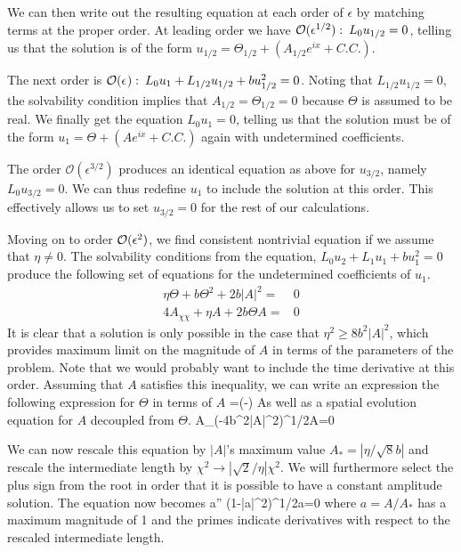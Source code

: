 \documentclass[../main/WavelengthCompetition.tex]{subfiles}
\begin{document}
We can then write out the resulting equation at each order of $\epsilon$ by matching terms at the proper order.
At leading order we have $\mathcal{O}(\epsilon^{1/2}): \: L_0 u_{1/2} =0$, telling us that the solution is of the form $u_{1/2} =\Theta_{1/2} + (A_{1/2} e^{ix} +C.C.)$.

The next order is $\mathcal{O}(\epsilon^{}): \:  L_0 u_{1}+L_{1/2} u_{1/2}  +b u_{1/2}^2=0$.  Noting that $L_{1/2} u_{1/2} =0$, the solvability condition implies that $A_{1/2}=\Theta_{1/2}=0$ because $\Theta$ is assumed to be real.  We finally get the equation $L_0 u_1=0$, telling us that the solution must be of the form $u_{1} =\Theta + (A e^{ix} +C.C.)$ again with undetermined coefficients.

The order $\mathcal{O}(\epsilon^{3/2})$ produces an  identical equation as above for $u_{3/2}$, namely $L_0 u_{3/2} =0$.  We can thus redefine $u_1$ to include the solution at this order.  This effectively allows us to set $u_{3/2}=0$ for the rest of our calculations.

Moving on to order $\mathcal{O}(\epsilon^{2})$, we find consistent nontrivial equation if we assume that $\eta\neq0$.  The solvability conditions from the equation, $L_0 u_2 +L_1 u_1 +b u_1^2=0$ produce the following set of equations for the undetermined coefficients of $u_1$.
\begin{subequations}
\begin{align}
\eta \Theta+b\Theta^2+2b| A|^2 =&0\\
4 A_{\chi\chi}+\eta A +2 b \Theta A =&0
\end{align}
\end{subequations}
It is clear that a solution is only possible in the case that $\eta^2\geq 8 b^2 |A|^2$, which provides maximum limit on the magnitude of $A$ in terms of the parameters of the problem.  Note that we would probably want to include the time derivative at this order.  Assuming that $A$ satisfies this inequality, we can write an expression the following expression for $\Theta$ in terms of $A$
\beqn
\Theta=\left(-\eta\pm{}\right)
\eeqn
As well as a spatial evolution equation for $A$ decoupled from $\Theta$.
\beqn
A_{\chi\chi}\pm \left(-4b^2|A|^2\right)^{1/2}A=0
\eeqn

We can now rescale this equation by $|A|$'s maximum value $A_*=|\eta/\sqrt{8}b|$ and rescale the intermediate length by $\chi^2 \rightarrow|\sqrt{2}/\eta| \chi^2$.  We will furthermore select the plus sign from the root in order that it is possible to have a constant amplitude solution.  The equation now becomes
\beqn
a'' \pm \left(1-|a|^2\right)^{1/2}a=0
\eeqn
where $a=A/A_*$ has a maximum magnitude of 1 and the primes indicate derivatives with respect to the rescaled intermediate length.
\end{document}
